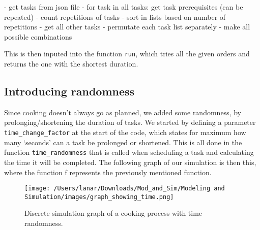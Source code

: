 \begin{verbnobox}
- get tasks from json file
- for task in all tasks:
    get task prerequisites (can be repeated)
- count repetitions of tasks
- sort in lists based on number of repetitions
- get all other tasks
- permutate each task list separately
- make all possible combinations 
\end{verbnobox}

This is then inputed into the function \texttt{run}, which tries all the given orders and returns the one with the shortest duration. 


\subsection{Introducing randomness}
Since cooking doesn't always go as planned, we added some randomness, by prolonging/shortening the duration of tasks. We started by defining a parameter \texttt{time\_change\_factor} at the start of the code, which states for maximum how many `seconds' can a task be prolonged or shortened. 
This is all done in the function \texttt{time\_randomness} that is called when scheduling a task and calculating the time it will be completed. The following graph of our simulation is then this, where the function f represents the previously mentioned function. 

\begin{figure}[H]
    \centerline{\texttt{[image: /Users/lanar/Downloads/Mod\_and\_Sim/Modeling and Simulation/images/graph\_showing\_time.png]}}
    \caption{Discrete simulation graph of a cooking process with time randomness.}
    \label{fig2}
\end{figure}


